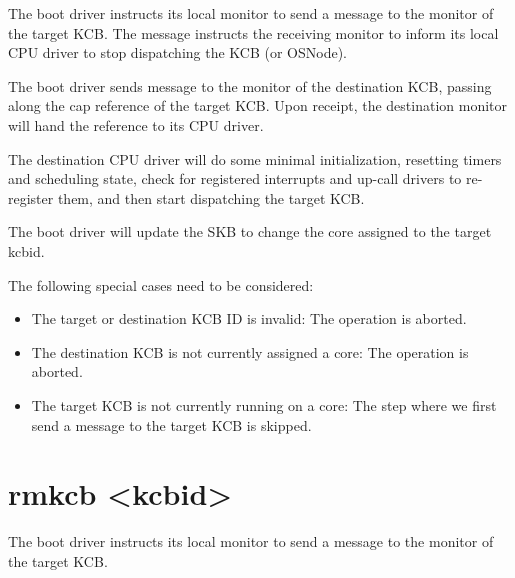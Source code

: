 \documentclass[a4paper,11pt,twoside]{report}
\begin{document}
{{\begin{penumerate}

\item The boot driver instructs its local monitor to send a message to the
monitor of the target KCB. The message instructs the receiving monitor to inform
its local CPU driver to stop dispatching the KCB (or OSNode).

\item The boot driver sends message to the monitor of the destination KCB,
passing along the cap reference of the target KCB. Upon receipt, the destination
monitor will hand the reference to its CPU driver.

\item The destination CPU driver will do some minimal initialization, resetting
timers and scheduling state, check for registered interrupts and up-call drivers
to re-register them, and then start dispatching the target KCB.

\item The boot driver will update the SKB to change the core assigned to the
target kcbid.

\end{penumerate}


The following special cases need to be considered:

\begin{itemize}

    \item The target or destination KCB ID is invalid: The operation is aborted.

    \item The destination KCB is not currently assigned a core: The operation is
    aborted.

    \item The target KCB is not currently running on a core: The step where we
    first send a message to the target KCB is skipped.

\end{itemize}


\section{rmkcb \textless kcbid\textgreater}

\begin{penumerate}

\item The boot driver instructs its local monitor to send a message to the
monitor of the target KCB.


\end{penumerate}}}
\end{document}
